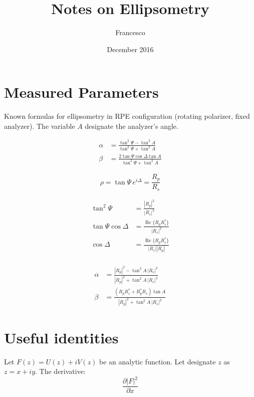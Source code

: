 \documentclass{article}
\title{Notes on Ellipsometry}
\author{Francesco}
\date{December 2016}
\begin{document}
\section{Measured Parameters}
Known formulas for ellipsometry in RPE configuration (rotating polarizer, fixed analyzer). The variable $A$ designate the analyzer's angle.

\begin{align}
    \alpha & = \frac{\tan^2 \Psi - \tan^2 A}{\tan^2 \Psi + \tan^2 A} \\
    \beta & = \frac{2 \tan \Psi \cos \Delta \tan A}{\tan^2 \Psi + \tan^2 A}
\end{align}

\begin{equation}
    \rho = \tan \Psi \, e^{i \Delta} = \frac{R_p}{R_s}
\end{equation}

\begin{align*}
     \tan^2 \Psi & = \frac{|R_p|^2}{|R_s|^2} \\
     \tan \Psi \cos \Delta & = \frac{\operatorname{Re}\{R_p R_s^\ast\}}{|R_s|^2} \\
     \cos \Delta & = \frac{\operatorname{Re}\{R_p R_s^\ast\}}{|R_s| |R_p|} \\
\end{align*}

\begin{align}
    \alpha & = \frac{|R_p|^2 - \tan^2 A \, |R_s|^2}{|R_p|^2 + \tan^2 A \, |R_s|^2} \\
    \beta & = \frac{(R_p R_s^\ast + R_p^\ast R_s) \tan A}{|R_p|^2 + \tan^2 A \, |R_s|^2}
\end{align}

\section{Useful identities}

Let $F(z) = U(z) + i V(z)$ be an analytic function. Let designate $z$ as $z = x + i y$. The derivative:
\begin{equation*}
    \frac{\partial |F|^2}{\partial x}
\end{equation*}
\end{document}
